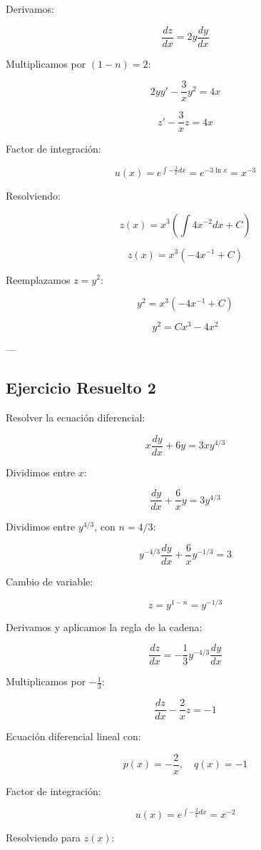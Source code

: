 Derivamos:

\[
\frac{dz}{dx} = 2y \frac{dy}{dx}
\]

Multiplicamos por \( (1-n) = 2 \):

\[
2yy' - \frac{3}{x} y^2 = 4x
\]

\[
z' - \frac{3}{x} z = 4x
\]

Factor de integración:

\[
u(x) = e^{\int -\frac{3}{x} dx} = e^{-3\ln x} = x^{-3}
\]

Resolviendo:

\[
z(x) = x^3 \left(\int 4x^{-2} dx + C\right)
\]

\[
z(x) = x^3 \left(-4x^{-1} + C\right)
\]

Reemplazamos \( z = y^2 \):

\[
y^2 = x^3 \left(-4x^{-1} + C\right)
\]

\[
y^2 = Cx^3 - 4x^2
\]

---

\subsection {Ejercicio Resuelto 2}

Resolver la ecuación diferencial:

\[
x \frac{dy}{dx} + 6y = 3x y^{4/3}
\]

Dividimos entre \( x \):

\[
\frac{dy}{dx} + \frac{6}{x} y = 3y^{4/3}
\]

Dividimos entre \( y^{4/3} \), con \( n = 4/3 \):

\[
y^{-4/3} \frac{dy}{dx} + \frac{6}{x} y^{-1/3} = 3
\]

Cambio de variable:

\[
z = y^{1-n} = y^{-1/3}
\]

Derivamos y aplicamos la regla de la cadena:

\[
\frac{dz}{dx} = -\frac{1}{3} y^{-4/3} \frac{dy}{dx}
\]

Multiplicamos por \( -\frac{1}{3} \):

\[
\frac{dz}{dx} - \frac{2}{x} z = -1
\]

Ecuación diferencial lineal con:

\[
p(x) = -\frac{2}{x}, \quad q(x) = -1
\]

Factor de integración:

\[
u(x) = e^{\int -\frac{2}{x} dx} = x^{-2}
\]

Resolviendo para \( z(x) \):

